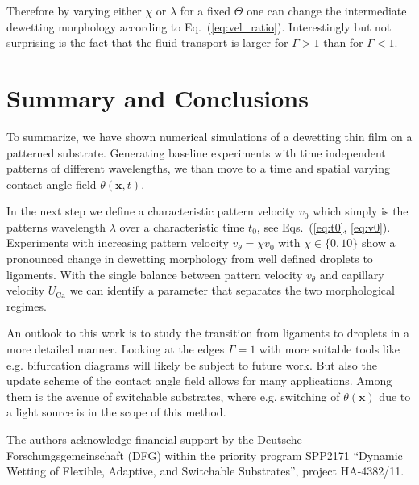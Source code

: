 \documentclass[twocolumn,amsmath,amssymb,showpacs,pre,nofootinbib,superscriptaddress]{revtex4-1} %
\begin{document}
Therefore by varying either $\chi$ or $\lambda$ for a fixed $\Theta$ one can change the intermediate dewetting morphology according to Eq.~(\ref{eq:vel_ratio}).
Interestingly but not surprising is the fact that the fluid transport is larger for $\Gamma > 1$ than for $\Gamma < 1$.

\section{Summary and Conclusions}\label{sec:sum_conclu}
To summarize, we have shown numerical simulations of a dewetting thin film on a patterned substrate.
Generating baseline experiments with time independent patterns of different wavelengths, we than move to a time and spatial varying contact angle field $\theta(\mathbf{x},t)$.

In the next step we define a characteristic pattern velocity $v_0$ which simply is the patterns wavelength $\lambda$ over a characteristic time $t_0$, see Eqs.~(\ref{eq:t0}, \ref{eq:v0}).
Experiments with increasing pattern velocity $v_{\theta} = \chi v_0$ with $\chi\in\{0,10\}$ show a pronounced change in dewetting morphology from well defined droplets to ligaments.
With the single balance between pattern velocity $v_{\theta}$ and capillary velocity $U_{\text{Ca}}$ we can identify a parameter that separates the two morphological regimes.

An outlook to this work is to study the transition from ligaments to droplets in a more detailed manner.
Looking at the edges $\Gamma =1$ with more suitable tools like e.g. bifurcation diagrams will likely be subject to future work.
But also the update scheme of the contact angle field allows for many applications.
Among them is the avenue of switchable substrates, where e.g. switching of $\theta(\mathbf{x})$ due to a light source is in the scope of this method.

\begin{acknowledgements}
The authors acknowledge financial support by the Deutsche Forschungsgemeinschaft (DFG) within the priority program SPP2171 ``Dynamic Wetting of Flexible, Adaptive, and Switchable Substrates'', project HA-4382/11.
\end{acknowledgements}



\end{document}
